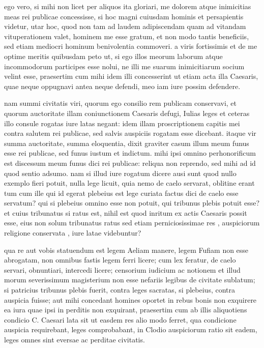  ego vero, si mihi non licet per aliquos ita gloriari, me dolorem atque inimicitias meas rei publicae concessisse, si hoc magni cuiusdam hominis et persapientis videtur, utar hoc, quod non tam ad laudem adipiscendam quam ad vitandam vituperationem valet, hominem me esse gratum, et non modo tantis beneficiis, sed etiam mediocri hominum benivolentia commoveri. a viris fortissimis et de me optime meritis quibusdam peto ut, si ego illos meorum laborum atque incommodorum participes esse nolui, ne illi me suarum inimicitiarum socium velint esse, praesertim cum mihi idem illi concesserint ut etiam acta illa Caesaris, quae neque oppugnavi antea neque defendi, meo iam iure possim defendere.

 nam summi civitatis viri, quorum ego consilio rem publicam conservavi, et quorum auctoritate illam coniunctionem Caesaris defugi, Iulias leges et ceteras illo consule rogatas iure latas negant: idem illam proscriptionem capitis mei contra salutem rei publicae, sed salvis auspiciis rogatam esse dicebant. itaque vir summa auctoritate, summa eloquentia, dixit graviter casum illum meum funus esse rei publicae, sed funus iustum et indictum. mihi ipsi omnino perhonorificum est discessum meum funus dici rei publicae: reliqua non reprendo, sed mihi ad id quod sentio adsumo. nam si illud iure rogatum dicere ausi sunt quod nullo exemplo fieri potuit, nulla lege licuit, quia nemo de caelo servarat, oblitine erant tum cum ille qui id egerat plebeius est lege curiata factus dici de caelo esse servatum? qui si plebeius omnino esse non potuit, qui tribunus plebis potuit esse? et cuius tribunatus si ratus est, nihil est quod inritum ex actis Caesaris possit esse, eius non solum tribunatus ratus sed etiam perniciosissimae res , auspiciorum religione conservata , iure latae videbuntur?

 qua re aut vobis statuendum est legem Aeliam manere, legem Fufiam non esse abrogatam, non omnibus fastis legem ferri licere; cum lex feratur, de caelo servari, obnuntiari, intercedi licere; censorium iudicium ac notionem et illud morum severissimum magisterium non esse nefariis legibus de civitate sublatum; si patricius tribunus plebis fuerit, contra leges sacratas, si plebeius, contra auspicia fuisse; aut mihi concedant homines oportet in rebus bonis non exquirere ea iura quae ipsi in perditis non exquirant, praesertim cum ab illis aliquotiens condicio C. Caesari lata sit ut easdem res alio modo ferret, qua condicione auspicia requirebant, leges comprobabant, in Clodio auspiciorum ratio sit eadem, leges omnes sint eversae ac perditae civitatis.

